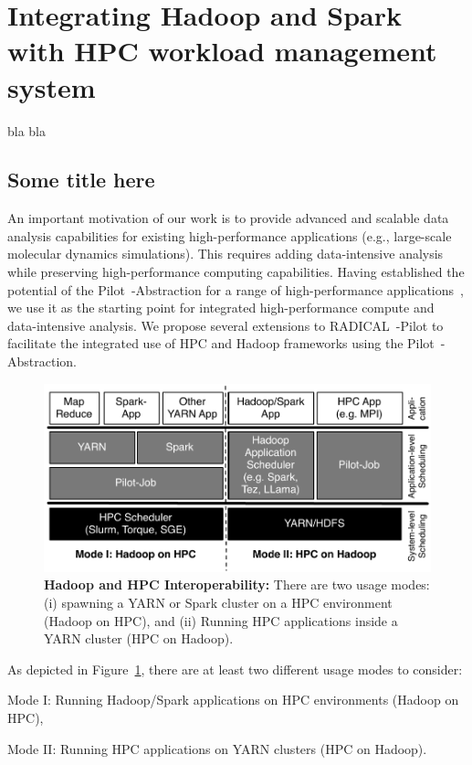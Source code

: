 \label{data_hpc}
\section{Integrating Hadoop and Spark with HPC workload management system}
\label{sec:pilot-data-hadoop}
bla bla
\subsection{Some title here}
An important motivation of our work is to provide advanced and scalable data analysis capabilities for existing high-performance applications (e.g., large-scale molecular dynamics simulations).
This requires adding data-intensive analysis while preserving high-performance computing capabilities.
Having established the potential of the Pilot~-Abstraction for a range of high-performance applications~\cite{treikalis2016repex,ragothaman2014developing,ko2014numerical}, we use it as the starting point for integrated high-performance compute and data-intensive analysis.
We propose several extensions to RADICAL~-Pilot to facilitate the integrated use of HPC and Hadoop frameworks using the Pilot~-Abstraction.

\begin{figure}[t]
    \centering
    \includegraphics[width=.95\textwidth]{figures/data_analytics_hpc/hpc_hadoop/hadoop-on-hpc-viceverse.pdf}
    \caption{\textbf{Hadoop and HPC Interoperability:}
        There are two usage modes:
        (i) spawning a YARN or Spark cluster on a HPC environment (Hadoop on HPC), and
        (ii) Running HPC applications inside a YARN cluster (HPC on Hadoop).
        \label{fig:figures_hadoop-on-hpc-viceverse}}
\end{figure}

As depicted in Figure~\ref{fig:figures_hadoop-on-hpc-viceverse}, there are at least two different usage modes to consider:
\begin{compactenum}[(i)]
    \item Mode I: Running Hadoop/Spark applications on HPC environments (Hadoop on HPC),
    \item Mode II: Running HPC applications on YARN clusters (HPC on Hadoop).
\end{compactenum}

